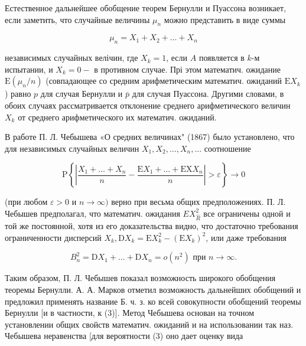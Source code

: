 \documentclass[10pt]{article}
\begin{document}
Естественное дальнейшее обобщение теорем Бернулли и Пуассона возникает, если заметить, что случайные величины $\mu_{n}$ можно представить в виде суммы



\[

\mu_{n}=X_{1}+X_{2}+\ldots+X_{n}

\]



независимых случайных велічин, где $X_{k}=1$, если $A$ появляется в $k$-м испытании, и $X_{k}=0-$ в противном случае. Прі этом математич. ожидание $\mathrm{E}\left(\mu_{n} / n\right)$ (совпадающее со средним арифметическим математич. ожиданий $\mathrm{E} X_{k}$ ) равно $p$ для случая Бернулли и $\bar{p}$ для случая Пуассона. Другими словами, в обоих случаях рассматривается отклонение среднего арифметического величин $X_{k}$ от среднего арифметического их математич. ожиданий.



В работе П. Л. Чебышева «О средних величинах" (1867) было установлено, что для независимых случайных величин $X_{1}, X_{2}, \ldots, X_{n}, \ldots$ соотношение



\[

\mathrm{P}\left\{\left|\frac{X_{1}+\ldots+X_{n}}{n}-\frac{\mathrm{E} X_{1}+\ldots+\mathrm{EX} X_{n}}{n}\right|>\varepsilon\right\} \rightarrow 0

\]



(при любом $\varepsilon>0$ и $n \rightarrow \infty)$ верно при весьма общих предположениях. П. Л. Чебышев предполагал, что математич. ожидания $E X_{\hat{R}}^{2}$ все ограничены одной и той же постоянной, хотя из его доказательства видно, что достаточно требования ограниченности дисперсий $X_{k}, \mathrm{D} X_{k}=\mathrm{E} X_{k}^{2}-\left(\mathrm{E} X_{k}\right)^{2}$, или даже требования



\[

B_{n}^{2}=\mathrm{D} X_{1}+\ldots+\mathrm{D} X_{n}=o\left(n^{2}\right) \text { при } n \rightarrow \infty .

\]



Таким образом, П. Л. Чебышев показал возможность широкого обобщения теоремы Бернулли. А. А. Марков отметил возможность дальнейших обобщений и предложил применять название Б. ч. з. ко всей совокупности обобщений теоремы Бернулли [и в частности, к (3)]. Метод Чебышева основан на точном установлении общих свойств математич. ожиданий и на использовании так наз. Чебышева неравенства [для вероятности (3) оно дает оценку вида
\end{document}
